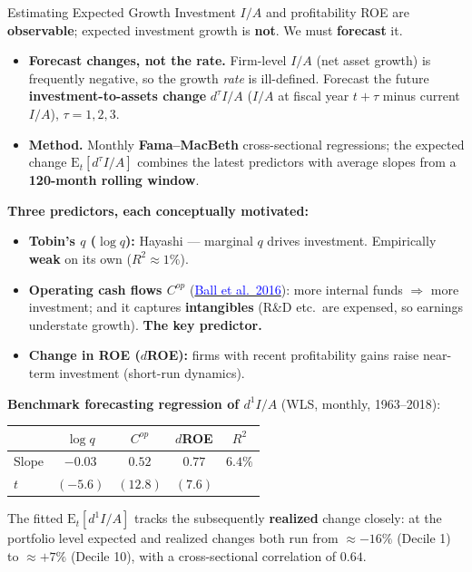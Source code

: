 \documentclass{beamer}
\begin{document}
\begin{frame}[allowframebreaks]{Estimating Expected Growth}
	Investment $I/A$ and profitability ROE are \textbf{observable}; expected investment growth is \textbf{not}. We must \textbf{forecast} it.
	\begin{itemize}
		\item \textbf{Forecast changes, not the rate.} Firm-level $I/A$ (net asset growth) is frequently negative, so the growth \textit{rate} is ill-defined. Forecast the future \textbf{investment-to-assets change} $d^{\tau}I/A$ ($I/A$ at fiscal year $t{+}\tau$ minus current $I/A$), $\tau=1,2,3$.
		\item \textbf{Method.} Monthly \textbf{Fama--MacBeth} cross-sectional regressions; the expected change $\mathrm{E}_t[d^{\tau}I/A]$ combines the latest predictors with average slopes from a \textbf{120-month rolling window}.
	\end{itemize}
	\textbf{Three predictors, each conceptually motivated:}
	\begin{itemize}
		\item \textbf{Tobin's $q$ ($\log q$):} Hayashi --- marginal $q$ drives investment. Empirically \textbf{weak} on its own ($R^2\approx1\%$).
		\item \textbf{Operating cash flows $C^{op}$} (\href{https://doi.org/10.1016/j.jfineco.2016.03.002}{\textcolor{blue}{Ball et al.\ 2016}}): more internal funds $\Rightarrow$ more investment; and it captures \textbf{intangibles} (R\&D etc.\ are expensed, so earnings understate growth). \textbf{The key predictor.}
		\item \textbf{Change in ROE ($d$ROE):} firms with recent profitability gains raise near-term investment (short-run dynamics).
	\end{itemize}
	\break
	\textbf{Benchmark forecasting regression of $d^{1}I/A$} (WLS, monthly, 1963--2018):
	\begin{center}
		\small
		\begin{tabular}{@{}lcccc@{}}
			\toprule
			& $\log q$ & $C^{op}$ & $d$ROE & $R^2$ \\
			\midrule
			Slope & $-0.03$ & $0.52$ & $0.77$ & $6.4\%$ \\
			$t$   & $(-5.6)$ & $(12.8)$ & $(7.6)$ & \\
			\bottomrule
		\end{tabular}
	\end{center}
	The fitted $\mathrm{E}_t[d^{1}I/A]$ tracks the subsequently \textbf{realized} change closely: at the portfolio level expected and realized changes both run from $\approx-16\%$ (Decile 1) to $\approx+7\%$ (Decile 10), with a cross-sectional correlation of $0.64$.
\end{frame}
\end{document}
